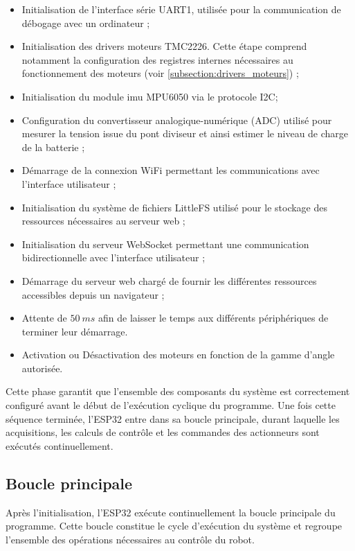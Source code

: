 \begin{itemize}
    \item Initialisation de l'interface série UART1, utilisée pour la communication de débogage avec un ordinateur ;
    \item Initialisation des drivers moteurs TMC2226. Cette étape comprend notamment la configuration des registres internes nécessaires au fonctionnement des moteurs (voir \ref{subsection:drivers_moteurs}) ;
    \item Initialisation du module \acrshort{imu} MPU6050 via le protocole I2C;
    \item Configuration du convertisseur analogique-numérique (ADC) utilisé pour mesurer la tension issue du pont diviseur et ainsi estimer le niveau de charge de la batterie ;
    \item Démarrage de la connexion WiFi permettant les communications avec l'interface utilisateur ;
    \item Initialisation du système de fichiers LittleFS utilisé pour le stockage des ressources nécessaires au serveur web ;
    \item Initialisation du serveur WebSocket permettant une communication bidirectionnelle avec l'interface utilisateur ;
    \item Démarrage du serveur web chargé de fournir les différentes ressources accessibles depuis un navigateur ;
    \item Attente de $50~ms$ afin de laisser le temps aux différents périphériques de terminer leur démarrage.
    \item Activation ou Désactivation des moteurs en fonction de la gamme d'angle autorisée.
\end{itemize}

Cette phase garantit que l'ensemble des composants du système est correctement configuré avant le début de l'exécution cyclique du programme. Une fois cette séquence terminée, l'ESP32 entre dans sa boucle principale, durant laquelle les acquisitions, les calculs de contrôle et les commandes des actionneurs sont exécutés continuellement.

\subsection{Boucle principale}

Après l'initialisation, l'ESP32 exécute continuellement la boucle principale du programme. Cette boucle constitue le cycle d'exécution du système et regroupe l'ensemble des opérations nécessaires au contrôle du robot.

